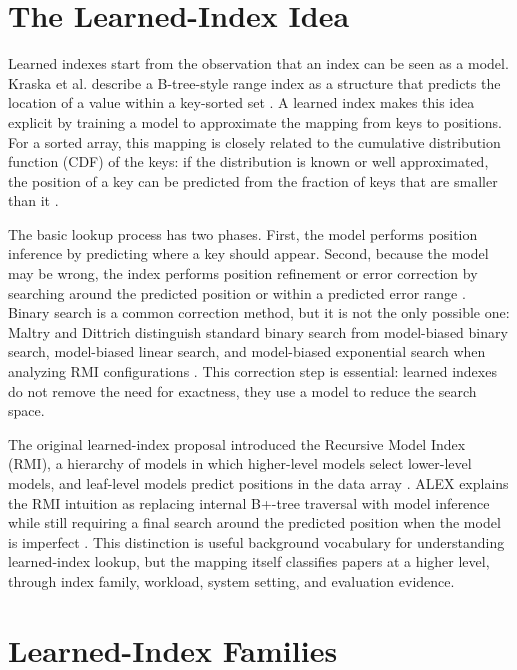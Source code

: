 \documentclass[a4paper, 12pt, twoside]{report}
\begin{document}
\section{The Learned-Index Idea}

Learned indexes start from the observation that an index can be seen as a model. Kraska et al. describe a B-tree-style range index as a structure that predicts the location of a value within a key-sorted set \cite{kraska2018}. A learned index makes this idea explicit by training a model to approximate the mapping from keys to positions. For a sorted array, this mapping is closely related to the cumulative distribution function (CDF) of the keys: if the distribution is known or well approximated, the position of a key can be predicted from the fraction of keys that are smaller than it \cite{kraska2018,marcus2020benchmarking}.

The basic lookup process has two phases. First, the model performs position inference by predicting where a key should appear. Second, because the model may be wrong, the index performs position refinement or error correction by searching around the predicted position or within a predicted error range \cite{sun2023learned,maltry2022critical}. Binary search is a common correction method, but it is not the only possible one: Maltry and Dittrich distinguish standard binary search from model-biased binary search, model-biased linear search, and model-biased exponential search when analyzing RMI configurations \cite{maltry2022critical}. This correction step is essential: learned indexes do not remove the need for exactness, they use a model to reduce the search space.

The original learned-index proposal introduced the Recursive Model Index (RMI), a hierarchy of models in which higher-level models select lower-level models, and leaf-level models predict positions in the data array \cite{kraska2018}. ALEX explains the RMI intuition as replacing internal B+-tree traversal with model inference while still requiring a final search around the predicted position when the model is imperfect \cite{ding2020alex}. This distinction is useful background vocabulary for understanding learned-index lookup, but the mapping itself classifies papers at a higher level, through index family, workload, system setting, and evaluation evidence.

\section{Learned-Index Families}
\end{document}

